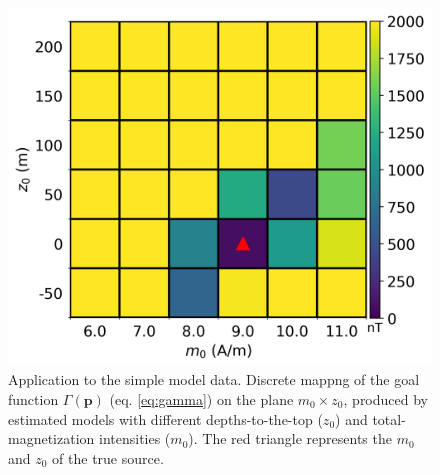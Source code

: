 \begin{figure}
	\centering
	\includegraphics[scale=.75]{figures/simple_gamma.png}
	\caption{Application to the simple model data. 
	Discrete mappng of the goal function $\Gamma(\mathbf{p})$ (eq. \ref{eq:gamma}) on the plane $ m_0 \times z_0 $,  
	produced by estimated models with different depths-to-the-top ($ z_0 $) and 
	total-magnetization intensities ($ m_0 $). 
	The red triangle represents the $m_0$ and $z_0$ of the true source.}
	\label{fig:simple_map}
\end{figure}


